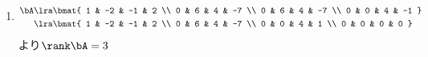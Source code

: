 \begin{ans*}
  ${}$
  \begin{enumerate}[label=(\arabic*)]
    \item
    \begin{align}
      \bA
      &\lra
      \bmat{
        1 & -2 & -1 & 2 \\
        0 & 6 & 4 & -7 \\
        0 & 6 & 4 & -7 \\
        0 & 0 & 4 & -1
      } \\
      &\lra
      \bmat{
        1 & -2 & -1 & 2 \\
        0 & 6 & 4 & -7 \\
        0 & 0 & 4 & 1 \\
        0 & 0 & 0 & 0
      }
    \end{align}
    より$\rank\bA = 3$


\end{enumerate}
\end{ans*}
